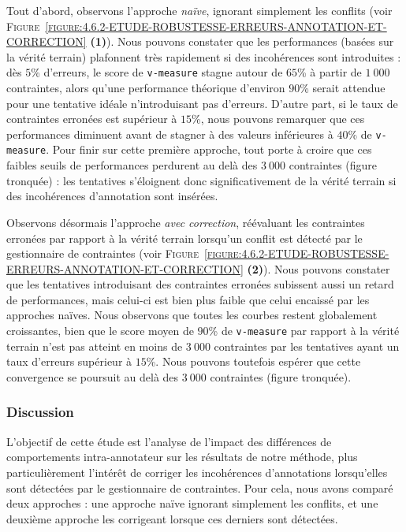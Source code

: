 			Tout d'abord, observons l'approche \textit{naïve}, ignorant simplement les conflits (voir \textsc{Figure~\ref{figure:4.6.2-ETUDE-ROBUSTESSE-ERREURS-ANNOTATION-ET-CORRECTION}} \textbf{(1)}).
			Nous pouvons constater que les performances (basées sur la vérité terrain) plafonnent très rapidement si des incohérences sont introduites : dès $5$\% d'erreurs, le score de \texttt{v-measure} stagne autour de $65$\% à partir de $1~000$ contraintes, alors qu'une performance théorique d'environ $90$\% serait attendue pour une tentative idéale n'introduisant pas d'erreurs.
			D'autre part, si le taux de contraintes erronées est supérieur à $15$\%, nous pouvons remarquer que ces performances diminuent avant de stagner à des valeurs inférieures à $40$\% de \texttt{v-measure}.
			Pour finir sur cette première approche, tout porte à croire que ces faibles seuils de performances perdurent au delà des $3~000$ contraintes (figure tronquée) : les tentatives s'éloignent donc significativement de la vérité terrain si des incohérences d'annotation sont insérées.
			
			Observons désormais l'approche \textit{avec correction}, réévaluant les contraintes erronées par rapport à la vérité terrain lorsqu'un conflit est détecté par le gestionnaire de contraintes (voir \textsc{Figure~\ref{figure:4.6.2-ETUDE-ROBUSTESSE-ERREURS-ANNOTATION-ET-CORRECTION}} \textbf{(2)}).
			Nous pouvons constater que les tentatives introduisant des contraintes erronées subissent aussi un retard de performances, mais celui-ci est bien plus faible que celui encaissé par les approches naïves.
			Nous observons que toutes les courbes restent globalement croissantes, bien que le score moyen de $90$\% de \texttt{v-measure} par rapport à la vérité terrain n'est pas atteint en moins de $3~000$ contraintes par les tentatives ayant un taux d'erreurs supérieur à $15$\%.
			Nous pouvons toutefois espérer que cette convergence se poursuit au delà des $3~000$ contraintes (figure tronquée).
		
		\subsubsection{Discussion}
		
			L'objectif de cette étude est l'analyse de l'impact des différences de comportements intra-annotateur sur les résultats de notre méthode, plus particulièrement l'intérêt de corriger les incohérences d'annotations lorsqu'elles sont détectées par le gestionnaire de contraintes.
			Pour cela, nous avons comparé deux approches : une approche naïve ignorant simplement les conflits, et une deuxième approche les corrigeant lorsque ces derniers sont détectées.
		

